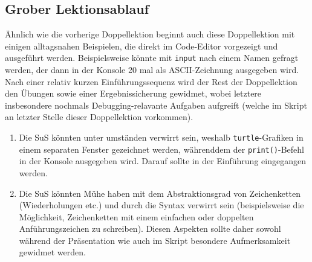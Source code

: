 \begin{myExBox}[title=DL \themycounter]
\subsection*{Grober Lektionsablauf}

Ähnlich wie die vorherige Doppellektion beginnt auch diese Doppellektion mit einigen alltagsnahen Beispielen, die direkt im Code-Editor vorgezeigt und ausgeführt werden. Beispielsweise könnte mit \lstinline|input| nach einem Namen gefragt werden, der dann in der Konsole 20 mal als ASCII-Zeichnung ausgegeben wird. Nach einer relativ kurzen Einführungssequenz wird der Rest der Doppellektion den Übungen sowie einer Ergebnissicherung gewidmet, wobei letztere insbesondere nochmals Debugging-relavante Aufgaben aufgreift (welche im Skript an letzter Stelle dieser Doppellektion vorkommen).

\begin{myExBox}[title=Mögliche Schwierigkeiten \& geeignete Massnahmen]
\begin{enumerate}
    \item Die SuS könnten unter umständen verwirrt sein, weshalb \lstinline|turtle|-Grafiken in einem separaten Fenster gezeichnet werden, währenddem der \lstinline|print()|-Befehl in der Konsole ausgegeben wird. Darauf sollte in der Einführung eingegangen werden.
    \item Die SuS könnten Mühe haben mit dem Abstraktionsgrad von Zeichenketten (Wiederholungen etc.) und durch die Syntax verwirrt sein (beispielsweise die Möglichkeit, Zeichenketten mit einem einfachen oder doppelten Anführungszeichen zu schreiben). Diesen Aspekten sollte daher sowohl während der Präsentation wie auch im Skript besondere Aufmerksamkeit gewidmet werden.
\end{enumerate}
\end{myExBox}
\end{myExBox}
\newpage{}

